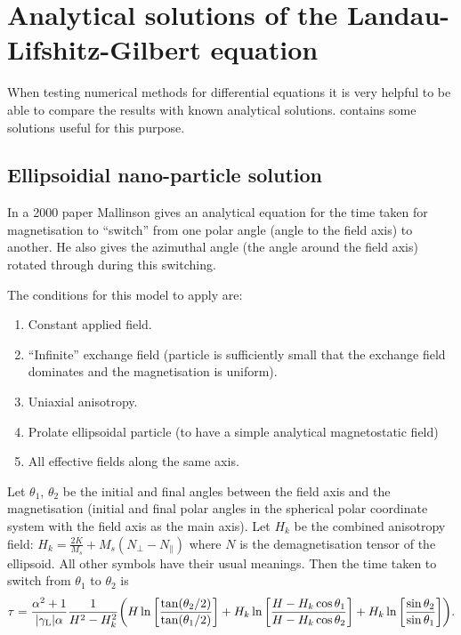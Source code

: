 \chapter{Analytical solutions of the Landau-Lifshitz-Gilbert equation}
\label{cha:analyt-solut-land}

When testing numerical methods for differential equations it is very helpful to be able to compare the results with known analytical solutions.
 contains some solutions useful for this purpose.

\section{Ellipsoidial nano-particle solution}

In a 2000 paper \cite{Mallinson2000} Mallinson gives an analytical equation for the time taken for magnetisation to ``switch'' from one polar angle (angle to the field axis) to another.
He also gives the azimuthal angle (the angle around the field axis) rotated through during this switching.

The conditions for this model to apply are:
\begin{enumerate}
\item Constant applied field.
\item ``Infinite'' exchange field (\ie particle is sufficiently small that the exchange field dominates and the magnetisation is uniform).
\item Uniaxial anisotropy.
\item Prolate ellipsoidal particle (to have a simple analytical magnetostatic field)
\item All effective fields along the same axis.
\end{enumerate}

Let $\theta_1$, $\theta_2$ be the initial and final angles between the field axis and the magnetisation (\ie initial and final polar angles in the spherical polar coordinate system with the field axis as the main axis).
Let $H_k$ be the combined anisotropy field: $H_k = \frac{2 K}{M_s} + M_s(N_\perp - N_\parallel)$ where $N$ is the demagnetisation tensor of the ellipsoid.
All other symbols have their usual meanings.
Then the time taken to switch from $\theta_1$ to $\theta_2$ is
\begin{equation}
  \tau = \frac{\alpha^2 +1}{{\left|{\gamma_{\mathrm{\tiny{L}}}} \right|} \alpha} \frac{1}{H^2 - H_k^2}
  {\left(  H \ln {\left[  \frac{\tan(\theta_2/2)}{\tan(\theta_1/2)}  \right]}
       + H_k \ln {\left[  \frac{H - H_k \cos\theta_1}{H - H_k \cos\theta_2}  \right]}
       + H_k \ln {\left[  \frac{\sin\theta_2}{\sin\theta_1}  \right]}
      \right)}.
\label{eq:80}
\end{equation}

